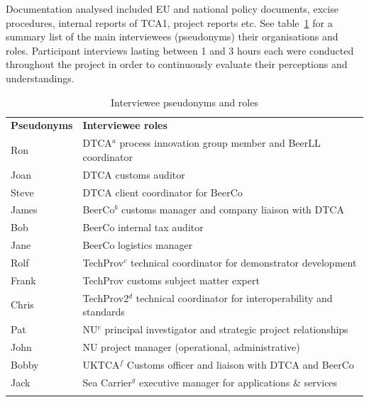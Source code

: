 \documentclass[graybox]{styles/svmult}
\begin{document}
Documentation analysed included EU and national policy documents, excise procedures, internal reports of TCA1, project reports etc.  
See table~\ref{tab:roles} for a summary list of the main interviewees (pseudonyms) their organisations and roles. Participant interviews lasting between 1 and 3 hours each were conducted throughout the project in order to continuously evaluate their perceptions and understandings.




\begin{table}[]
\caption{Interviewee pseudonyms and roles}
\label{tab:roles}
\begin{tabular}{p{0.2\linewidth}p{0.8\linewidth}}
\hline\noalign{\smallskip}
\textbf{Pseudonyms}	& \textbf{Interviewee roles}    \\
\noalign{\smallskip}\svhline\noalign{\smallskip}
Ron		& DTCA$^a$ process innovation group member and BeerLL coordinator \\ \noalign{\smallskip}
Joan	& DTCA customs auditor   \\ \noalign{\smallskip}
Steve	& DTCA client coordinator for BeerCo   \\ \noalign{\smallskip}
\hline \noalign{\smallskip}
James 	& BeerCo$^b$ customs manager and company liaison with DTCA    \\ \noalign{\smallskip}
Bob		& BeerCo internal tax auditor     \\ \noalign{\smallskip}
Jane	& BeerCo logistics manager   \\ \noalign{\smallskip}
\hline \noalign{\smallskip}
Rolf	& TechProv$^c$ technical coordinator for demonstrator development   \\ \noalign{\smallskip}
Frank	& TechProv customs subject matter expert \\ \noalign{\smallskip}
\hline \noalign{\smallskip}
Chris	& TechProv2$^d$ technical coordinator for interoperability and standards  \\ \noalign{\smallskip}
\hline \noalign{\smallskip}
Pat 		& NU$^e$ principal investigator and strategic project relationships  \\ \noalign{\smallskip}
John	& NU project manager  (operational, administrative)      \\ \noalign{\smallskip}
\hline \noalign{\smallskip}
Bobby	& UKTCA$^f$ Customs officer and liaison with DTCA and BeerCo \\ \noalign{\smallskip}
\hline \noalign{\smallskip}
Jack	& Sea Carrier$^g$ executive manager for applications \& services   \\ \noalign{\smallskip}

\end{tabular}
\end{table}
\end{document}
